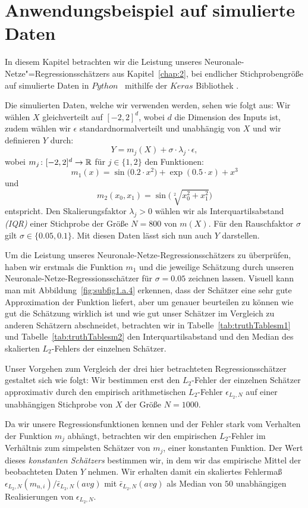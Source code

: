 \chapter{Anwendungsbeispiel auf simulierte Daten}
\label{chap:4}

In diesem Kapitel betrachten wir die Leistung unseres Neuronale-Netze"=Regressionsschätzers aus Kapitel~\ref{chap:2}, bei endlicher Stichprobengröße auf simulierte Daten in $Python$~\cite[Version 3.7.3]{van1995python} mithilfe der $Keras$ Bibliothek \cite{chollet2015keras}.

Die simulierten Daten, welche wir verwenden werden, sehen wie folgt aus:
Wir wählen $X$ gleichverteilt auf $[-2, 2]^d$, wobei $d$ die Dimension des Inputs ist, zudem wählen wir $\epsilon$ standardnormalverteilt und unabhängig von $X$ und wir definieren $Y$ durch:
$$Y = m_j(X) + \sigma \cdot \lambda_j \cdot \epsilon,$$ 
wobei $m_j \colon [-2, 2]^d \to \mathbb{R}$ für  $j \in \{1, 2\}$ den Funktionen:
$$ m_1(x) =  \sin\big(0.2 \cdot x^2\big) + \exp(0.5 \cdot x) + x^3$$
und
$$ m_2(x_0, x_1) = \sin\big(\sqrt[2]{x_0^2 + x_1^2}\big)$$
entspricht.
Den Skalierungsfaktor $\lambda_j > 0$ wählen wir als Interquartilsabstand \emph{(IQR)} einer Stichprobe der Größe $N = 800$ von $m(X)$. Für den Rauschfaktor $\sigma$ gilt $\sigma \in \{0.05, 0.1\}.$ Mit diesen Daten lässt sich nun auch $Y$ darstellen.

Um die Leistung unseres Neuronale-Netze-Regressionsschätzers zu überprüfen, haben wir erstmals die Funktion $m_1$ und die jeweilige Schätzung durch unseren Neuronale-Netze-Regressionsschätzer für $\sigma = 0.05$ zeichnen lassen. 
Visuell kann man mit Abbildung~\ref{fig:subfig1.a.4} erkennen, dass der Schätzer eine sehr gute Approximation der Funktion liefert, aber um genauer beurteilen zu können wie gut die Schätzung wirklich ist und wie gut unser Schätzer im Vergleich zu anderen Schätzern abschneidet, betrachten wir in Tabelle~\ref{tab:truthTablesm1} und Tabelle~\ref{tab:truthTablesm2} den Interquartilsabstand und den Median des skalierten $L_2$-Fehlers der einzelnen Schätzer. 

Unser Vorgehen zum Vergleich der drei hier betrachteten Regressionsschätzer gestaltet sich wie folgt:
Wir bestimmen erst den $L_2$-Fehler der einzelnen Schätzer approximativ durch den empirisch arithmetischen $L_2$-Fehler $\epsilon_{L_2,N}$ auf einer unabhängigen Stichprobe von $X$ der Größe $N = 1000$. 

Da wir unsere Regressionsfunktionen kennen und der Fehler stark vom Verhalten der Funktion $m_j$ abhängt, betrachten wir den empirischen $L_2$-Fehler im Verhältnis zum simpelsten Schätzer von $m_j$, einer konstanten Funktion. Der Wert dieses \textit{konstanten Schätzers} bestimmen wir, in dem wir das empirische Mittel der beobachteten Daten $Y$ nehmen. Wir erhalten damit ein skaliertes Fehlermaß $\epsilon_{L_2,N}(m_{n,i})/\bar{\epsilon}_{L_2,N}(avg)$ mit $\bar{\epsilon}_{L_2,N}(avg)$ als Median von $50$ unabhängigen Realisierungen von $\epsilon_{L_2,N}$. 

